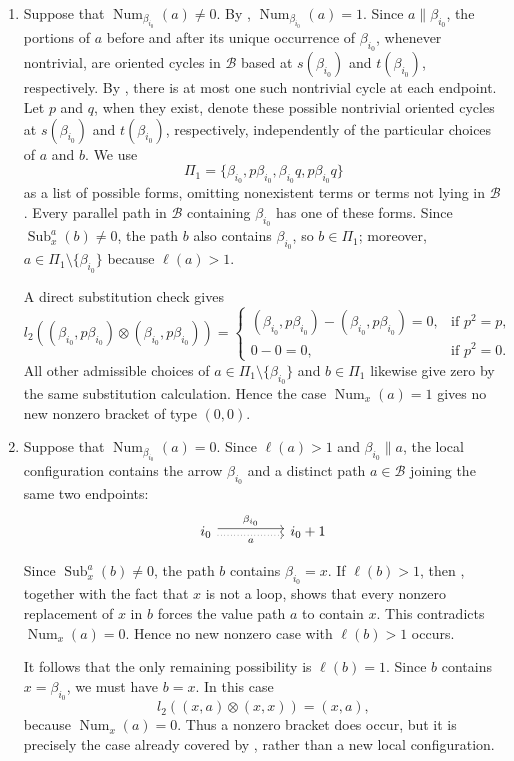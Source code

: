\documentclass[11pt,a4paper,reqno]{amsart}
\newcommand{\mB}{\mathcal B}
\newcommand{\Sub}{\operatorname{Sub}}
\newcommand{\para}[2]{(#1,#2)}
\newcommand{\num}[2]{\operatorname{Num}_{#1}(#2)}
\newcommand{\bi}{\beta_{i_0}}
\theoremstyle{plain}
\theoremstyle{definition}
\numberwithin{equation}{section}
\begin{document}
	\begin{enumerate}
		\item Suppose that $\num{\bi}{a}\neq0$.  By ,
		$\num{\bi}{a}=1$.  Since $a\parallel\bi$, the portions of $a$ before and after its unique
		occurrence of $\bi$, whenever nontrivial, are oriented cycles in
		$\mB$ based at $s(\bi)$ and $t(\bi)$, respectively.
		By ,
		there is at most one such nontrivial cycle at each endpoint.
		Let $p$ and $q$, when they exist, denote these possible nontrivial
		oriented cycles at $s(\bi)$ and $t(\bi)$, respectively, independently of
		the particular choices of $a$ and $b$.  We use
		\[\Pi_1=\{\bi, p\bi, \bi q, p\bi q\}\]
		as a list of possible forms, omitting nonexistent terms or terms not lying in $\mB$.
		Every parallel path in $\mB$ containing $\bi$ has one of these forms.
		Since $\Sub_x^a(b)\neq0$, the path $b$ also contains $\bi$, so
		$b\in\Pi_1$; moreover, $a\in\Pi_1\setminus\{\bi\}$ because $\ell(a)>1$.
		
		A direct substitution check gives
		\[l_2(\para{\bi}{p\bi}\otimes\para{\bi}{p\bi})=
		\begin{cases}
			\para{\bi}{p\bi}-\para{\bi}{p\bi}=0, & \text{if } p^2=p,\\
			0-0=0, & \text{if } p^2=0.
		\end{cases}\]
		All other admissible choices of $a\in\Pi_1\setminus\{\bi\}$ and $b\in\Pi_1$ likewise give zero by the same substitution calculation.
		Hence the case $\num{x}{a}=1$ gives no new nonzero bracket of type $(0,0)$.
		
		\item Suppose that $\num{\bi}{a}=0$.  Since $\ell(a)>1$ and
		$\bi\parallel a$, the local configuration contains the arrow $\bi$ and a
		distinct path $a\in\mB$ joining the same two endpoints:
		\[
		\begin{tikzcd}
			{i_0} && {i_0+1}
			\arrow["\bi", shift left, from=1-1, to=1-3]
			\arrow["a"', shift right, dotted, from=1-1, to=1-3]
		\end{tikzcd}
		\]
		
		Since $\Sub_x^a(b)\neq0$, the path $b$ contains $\bi=x$.  If
		$\ell(b)>1$, then , together with the
		fact that $x$ is not a loop, shows that every nonzero replacement of
		$x$ in $b$ forces the value path $a$ to contain $x$.  This contradicts
		$\num{x}{a}=0$.  Hence no new nonzero case with $\ell(b)>1$ occurs.
		
		It follows that the only remaining possibility is $\ell(b)=1$.  Since
		$b$ contains $x=\bi$, we must have $b=x$.  In this case
		\[
		l_2(\para{x}{a}\otimes\para{x}{x})=\para{x}{a},
		\]
		because $\num{x}{a}=0$.  Thus a nonzero bracket does occur, but it is
		precisely the case already covered by
		, rather than a new local configuration.
	\end{enumerate}
	
\end{document}

